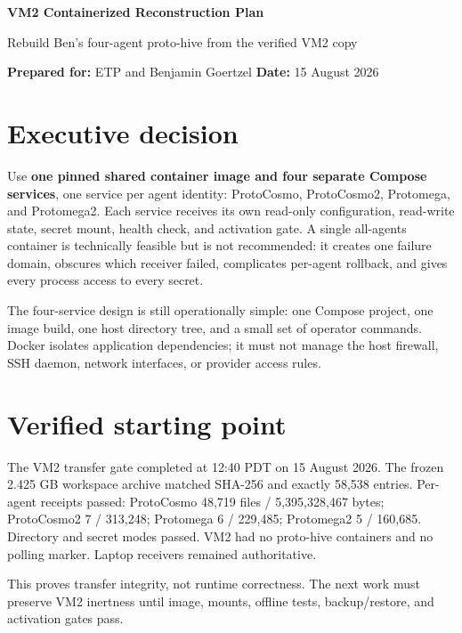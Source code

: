 \documentclass[11pt]{article}
\begin{document}
\begin{center}
{\LARGE\bfseries\color{navy} VM2 Containerized Reconstruction Plan}\par
\vspace{4pt}
{\large Rebuild Ben's four-agent proto-hive from the verified VM2 copy}\par
\vspace{8pt}
\textbf{Prepared for:} ETP and Benjamin Goertzel \quad \textbf{Date:} 15 August 2026
\end{center}

\section*{Executive decision}

Use \textbf{one pinned shared container image and four separate Compose services}, one service per agent identity: ProtoCosmo, ProtoCosmo2, Protomega, and Protomega2. Each service receives its own read-only configuration, read-write state, secret mount, health check, and activation gate. A single all-agents container is technically feasible but is not recommended: it creates one failure domain, obscures which receiver failed, complicates per-agent rollback, and gives every process access to every secret.

The four-service design is still operationally simple: one Compose project, one image build, one host directory tree, and a small set of operator commands. Docker isolates application dependencies; it must not manage the host firewall, SSH daemon, network interfaces, or provider access rules.

\section*{Verified starting point}

The VM2 transfer gate completed at 12:40 PDT on 15 August 2026. The frozen 2.425 GB workspace archive matched SHA-256 and exactly 58,538 entries. Per-agent receipts passed: ProtoCosmo 48,719 files / 5,395,328,467 bytes; ProtoCosmo2 7 / 313,248; Protomega 6 / 229,485; Protomega2 5 / 160,685. Directory and secret modes passed. VM2 had no proto-hive containers and no polling marker. Laptop receivers remained authoritative.

This proves transfer integrity, not runtime correctness. The next work must preserve VM2 inertness until image, mounts, offline tests, backup/restore, and activation gates pass.
\end{document}
